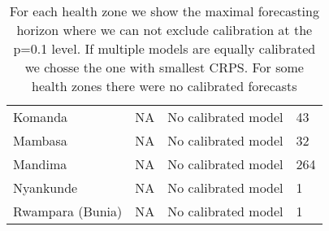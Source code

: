 \begin{table}[h!]
\begin{tabular}{|l|l|l|l|}
  Komanda & NA & No calibrated model & 43 \\ 
  Mambasa & NA & No calibrated model & 32 \\ 
  Mandima & NA & No calibrated model & 264 \\ 
  Nyankunde & NA & No calibrated model & 1 \\ 
  Rwampara (Bunia) & NA & No calibrated model & 1 \\ 
   \hline
\end{tabular}
\caption{For each health zone we show the maximal forecasting horizon where we can not exclude calibration at the p=0.1 level. If multiple models are equally calibrated we chosse the one with smallest CRPS. For some health zones there were no calibrated forecasts} 
\label{tab:best_model}
\end{table}
